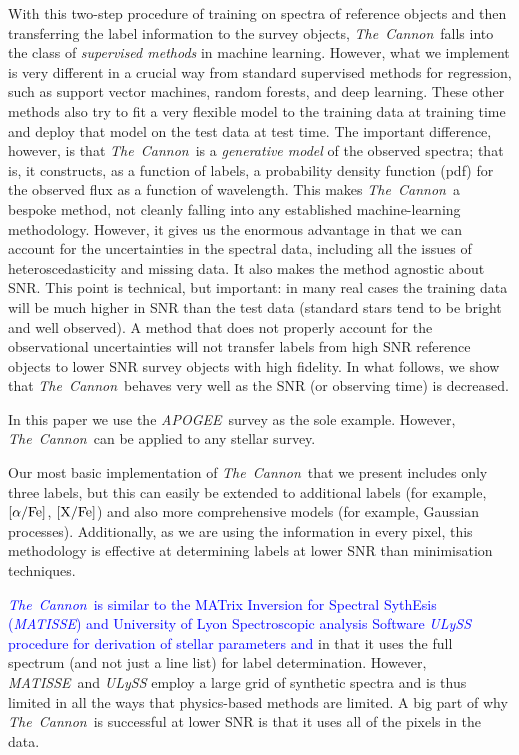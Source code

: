 \documentclass[12pt, preprint]{aastex}
\newcommand{\tc}{\textsl{The~Cannon}}
\newcommand{\apogee}{\textsl{APOGEE}}
\newcommand{\matisse}{\textsl{MATISSE}}
\newcommand{\xfe}{\mbox{$\rm [X/Fe]$}}
\newcommand{\alphafe}{\mbox{$\rm [\alpha/Fe]$}}
\begin{document}
With this two-step procedure of training on spectra of reference objects and then transferring the label information to the survey objects, \tc\ falls into the class of \emph{supervised methods} in machine learning. 
However, what we implement is very different in a crucial way from standard supervised methods for regression, such as support vector machines, random forests, and deep learning.
These other methods also try to fit a very flexible model to the training data at training time
and deploy that model on the test data at test time.
The important difference, however, is that \tc\ is a \emph{generative model} of the observed spectra;
that is, it constructs, as a function of labels, a probability density function (pdf) for the observed
flux as a function of wavelength. 
This makes \tc\ a bespoke method, not cleanly falling into any established machine-learning methodology.
However, it gives us the enormous advantage in that we can account for the uncertainties in the spectral data,
including all the issues of heteroscedasticity and missing data.
It also makes the method agnostic about SNR.
This point is technical, but important: in many real cases the training data will be much higher in SNR than the test data
(standard stars tend to be bright and well observed).
A method that does not properly account for the observational uncertainties will not transfer labels from high SNR reference objects to lower SNR survey objects with high fidelity.
In what follows, we show that \tc\ behaves very well as the SNR (or observing time) is decreased.

In this paper we use the \apogee\ survey as the sole example. 
However, \tc\ can be applied to any stellar survey.  

Our most basic implementation of \tc\ that we present includes only three labels, but this can easily be extended to additional labels  (for example, \alphafe, \xfe) and also more comprehensive models (for example, Gaussian processes). 
Additionally, as we are using the information in every pixel, this methodology is effective at determining labels at lower SNR than minimisation techniques.

\textcolor{blue}{ \tc\ is similar to the MATrix Inversion for Spectral SythEsis (\matisse) and  University of Lyon Spectroscopic analysis Software \textit{ULySS} procedure
for derivation of stellar parameters \citep{RB2006} and \citep{Koleva2009}} in that it uses the full spectrum
(and not just a line list) for label determination.
However, \matisse\ and \textit{ULySS} employ a large grid of synthetic spectra
and is thus limited in all the ways that physics-based methods are limited.
A big part of why \tc\ is successful at lower SNR
is that it uses all of the pixels in the data.
\end{document}
